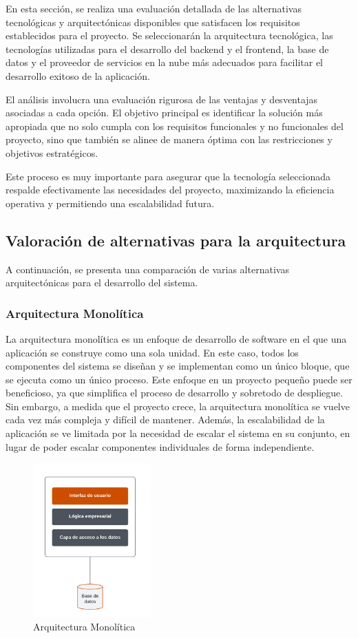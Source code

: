 En esta sección, se realiza una evaluación detallada de las alternativas tecnológicas y arquitectónicas disponibles que satisfacen los requisitos establecidos para el proyecto. 
Se seleccionarán la arquitectura tecnológica, las tecnologías utilizadas para el desarrollo del backend y el frontend, la base de datos y el proveedor de servicios en la nube más adecuados para facilitar el desarrollo exitoso de la aplicación.

El análisis involucra una evaluación rigurosa de las ventajas y desventajas asociadas a cada opción. El objetivo principal es identificar 
la solución más apropiada que no solo cumpla con los requisitos funcionales y no funcionales del proyecto, sino que también se alinee de manera óptima con las restricciones 
y objetivos estratégicos. 

Este proceso es muy importante para asegurar que la tecnología seleccionada respalde efectivamente las necesidades del proyecto, maximizando la eficiencia operativa y 
permitiendo una escalabilidad futura.

\subsection{Valoración de alternativas para la arquitectura}
A continuación, se presenta una comparación de varias alternativas arquitectónicas para el desarrollo del sistema.
\subsubsection{Arquitectura Monolítica}
La arquitectura monolítica es un enfoque de desarrollo de software en el que una aplicación se construye como una sola unidad. En este caso, todos los componentes del sistema se diseñan y se implementan como un único bloque, que se ejecuta como un único proceso.
Este enfoque en un proyecto pequeño puede ser beneficioso, ya que simplifica el proceso de desarrollo y sobretodo de despliegue. Sin embargo, a medida que el proyecto crece, la arquitectura monolítica se vuelve cada vez más compleja y difícil de mantener. Además, la escalabilidad de la aplicación se ve limitada por la necesidad de escalar el sistema en su conjunto, en lugar de poder escalar componentes individuales de forma independiente.
\begin{figure}[H]
    \centering
    \includegraphics[width=0.4\textwidth]{figures/4-Estudio-viabilidad/4_Monolitica.png}
    \caption{Arquitectura Monolítica}
    \label{fig:arquitectura_monolitica}
    \hypertarget{fig:arquitectura_monolitica}{}
\end{figure}

